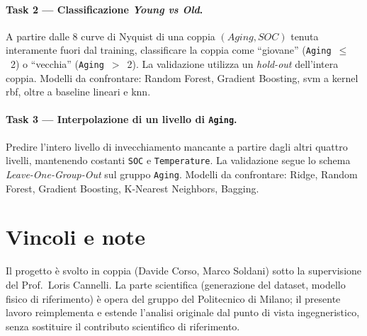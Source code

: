 \paragraph{Task 2 --- Classificazione \emph{Young vs Old}.}
A partire dalle 8 curve di Nyquist di una coppia
\((\textit{Aging}, \textit{SOC})\) tenuta interamente fuori dal
training, classificare la coppia come ``giovane''
(\texttt{Aging}~\(\le\)~2) o ``vecchia'' (\texttt{Aging}~\(>\)~2). La
validazione utilizza un \emph{hold-out} dell'intera coppia. Modelli da
confrontare: Random Forest, Gradient Boosting, \acrshort{svm} a kernel
\acrshort{rbf}, oltre a baseline lineari e \acrshort{knn}.

\paragraph{Task 3 --- Interpolazione di un livello di \texttt{Aging}.}
Predire l'intero livello di invecchiamento mancante a partire dagli
altri quattro livelli, mantenendo costanti \texttt{SOC} e
\texttt{Temperature}. La validazione segue lo schema
\emph{Leave-One-Group-Out} sul gruppo \texttt{Aging}. Modelli da
confrontare: Ridge, Random Forest, Gradient Boosting, K-Nearest
Neighbors, Bagging.

\section*{Vincoli e note}

Il progetto è svolto in coppia (Davide Corso, Marco Soldani) sotto la
supervisione del Prof.~Loris Cannelli. La parte scientifica
(generazione del dataset, modello fisico di riferimento) è opera del
gruppo del Politecnico di Milano; il presente lavoro reimplementa e
estende l'analisi originale dal punto di vista ingegneristico, senza
sostituire il contributo scientifico di riferimento.
